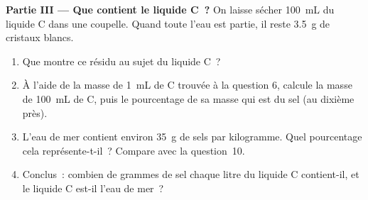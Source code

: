 \begin{problem}
\medskip
\noindent\textbf{Partie III --- Que contient le liquide C~?}
On laisse sécher \qty{100}{mL} du liquide C dans une coupelle. Quand
toute l'eau est partie, il reste \qty{3.5}{g} de cristaux blancs.
\begin{enumerate}[resume]
  \item Que montre ce résidu au sujet du liquide C~?
  \item À l'aide de la masse de \qty{1}{mL} de C trouvée à la question 6,
        calcule la masse de \qty{100}{mL} de C, puis le pourcentage de sa
        masse qui est du sel (au dixième près).
  \item L'eau de mer contient environ \qty{35}{g} de sels par kilogramme.
        Quel pourcentage cela représente-t-il~? Compare avec la
        question~10.
  \item Conclus~: combien de grammes de sel chaque litre du liquide C
        contient-il, et le liquide C est-il l'eau de mer~?
\end{enumerate}
\end{problem}
